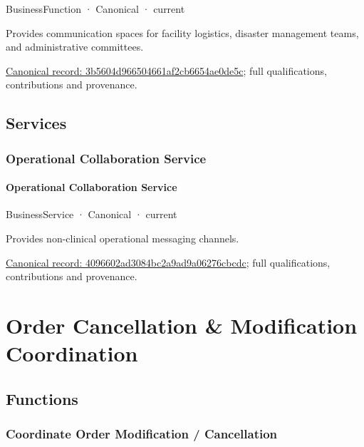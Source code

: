 \label{element:3b5604d966504661af2cb6654ae0de5c}
{\small BusinessFunction · Canonical · current}\par

Provides communication spaces for facility logistics, disaster management teams, and administrative committees.


{\footnotesize \href{../../../../continuum/business/business-function/3b5604d966504661af2cb6654ae0de5c.md}{Canonical record: 3b5604d966504661af2cb6654ae0de5c}; full qualifications, contributions and provenance.}\par
\subsection{Services}

\subsubsection{Operational Collaboration Service}

\paragraph{Operational Collaboration Service}

\label{element:4096602ad3084bc2a9ad9a06276cbcdc}
{\small BusinessService · Canonical · current}\par

Provides non-clinical operational messaging channels.


{\footnotesize \href{../../../../continuum/business/business-service/4096602ad3084bc2a9ad9a06276cbcdc.md}{Canonical record: 4096602ad3084bc2a9ad9a06276cbcdc}; full qualifications, contributions and provenance.}\par
\section{Order Cancellation \& Modification Coordination}

\subsection{Functions}

\subsubsection{Coordinate Order Modification / Cancellation}


